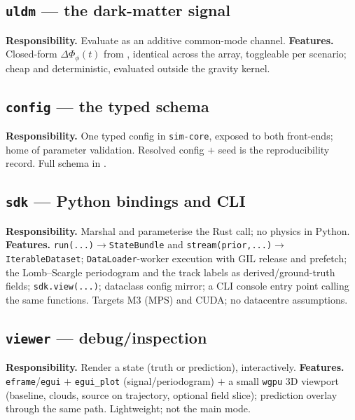 \documentclass[11pt,a4paper]{article}
\theoremstyle{reqstyle}
\begin{document}
\subsection{\texttt{uldm} --- the dark-matter signal}
\textbf{Responsibility.} Evaluate  as an additive common-mode channel.
\textbf{Features.} Closed-form $\Delta\Phi_\phi(t)$ from , identical across the
array, toggleable per scenario; cheap and deterministic, evaluated outside the gravity kernel.

\subsection{\texttt{config} --- the typed schema}
\textbf{Responsibility.} One typed config in \texttt{sim-core}, exposed to both front-ends;
home of parameter validation. Resolved config $+$ seed is the reproducibility record. Full
schema in .

\subsection{\texttt{sdk} --- Python bindings and CLI}
\textbf{Responsibility.} Marshal and parameterise the Rust call; no physics in Python.
\textbf{Features.} \texttt{run(...)$\to$StateBundle} and \texttt{stream(prior,...)$\to$
IterableDataset}; \texttt{DataLoader}-worker execution with GIL release and prefetch; the
Lomb--Scargle periodogram and the track labels as derived/ground-truth fields;
\texttt{sdk.view(...)}; dataclass config mirror; a CLI console entry point calling the same
functions. Targets M3 (MPS) and CUDA; no datacentre assumptions.

\subsection{\texttt{viewer} --- debug/inspection}
\textbf{Responsibility.} Render a state (truth or prediction), interactively.
\textbf{Features.} \texttt{eframe}/\texttt{egui} $+$ \texttt{egui\_plot} (signal/periodogram)
$+$ a small \texttt{wgpu} 3D viewport (baseline, clouds, source on trajectory, optional
field slice); prediction overlay through the same path. Lightweight; not the main mode.
\end{document}
